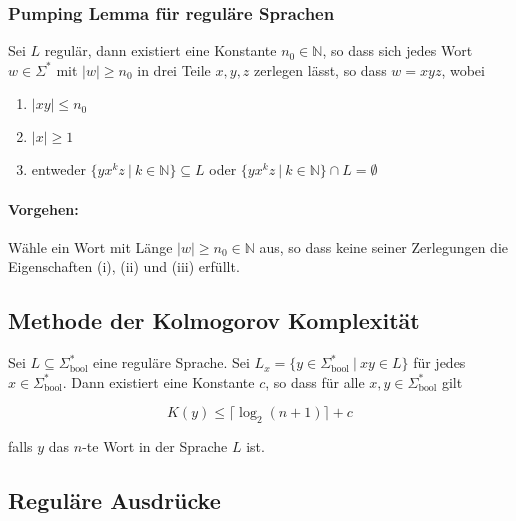 \documentclass[11pt]{article}
\begin{document}
\subsubsection{Pumping Lemma f{\"u}r regul{\"a}re Sprachen}

Sei $L$ regul{\"a}r, dann existiert eine Konstante $n_0 \in \mathbb{N}$, so dass sich jedes Wort $w \in \Sigma^*$ mit $|w| \geq n_0$ in drei Teile $x, y, z$ zerlegen l{\"a}sst, so dass $w = xyz$, wobei

\begin{enumerate}[label=(\roman*), noitemsep]
	\item $|xy| \leq n_0$
	\item $|x| \geq 1$
	\item entweder $\{yx^kz\ |\ k \in \mathbb{N}\} \subseteq L$ oder $\{yx^kz\ |\ k \in \mathbb{N}\} \cap L = \emptyset$
\end{enumerate}

\paragraph{Vorgehen:} W{\"a}hle ein Wort mit L{\"a}nge $|w| \geq n_0 \in \mathbb{N}$ aus, so dass keine seiner Zerlegungen die Eigenschaften (i), (ii) und (iii) erf{\"u}llt.

\subsection{Methode der Kolmogorov Komplexit{\"a}t}

Sei $L \subseteq \Sigma_\text{bool}^*$ eine regul{\"a}re Sprache. Sei $L_x = \{y \in \Sigma_\text{bool}^*\ |\ xy \in L\}$ f{\"u}r jedes $x \in \Sigma_\text{bool}^*$. Dann existiert eine Konstante $c$, so dass f{\"u}r alle $x,y \in \Sigma_\text{bool}^*$ gilt

\begin{equation*}
	K(y) \leq \lceil\log_2(n+1)\rceil + c
\end{equation*}

falls $y$ das $n$-te Wort in der Sprache $L$ ist.

\subsection{Regul{\"a}re Ausdr{\"u}cke}
\end{document}
